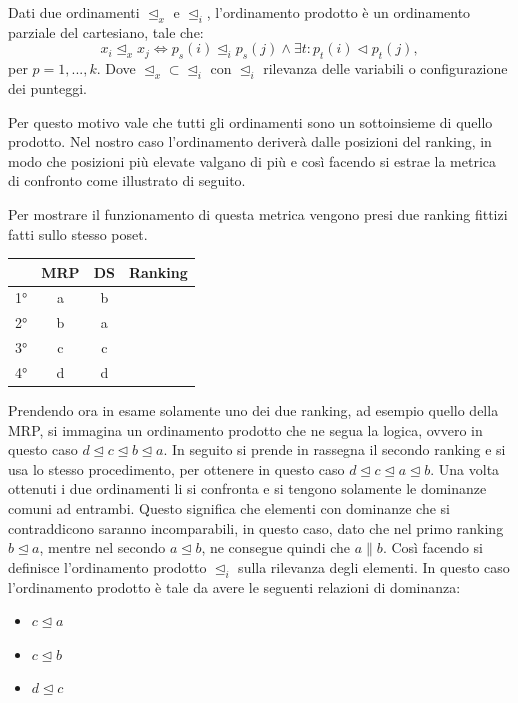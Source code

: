 \documentclass{report}
\begin{document}
\begin{definition}
Dati due ordinamenti $\unlhd_x$ e $\unlhd_i$, l'ordinamento prodotto è un ordinamento parziale del cartesiano, tale che: 
\[x_i\unlhd_x x_j \Leftrightarrow p_{s}(i)\unlhd_i p_{s}(j) \land \exists t:p_t(i) \lhd p_t(j),\]
per $p=1, ...,k$. Dove $\unlhd_x \subset \unlhd_i$ con $\unlhd_i$ rilevanza delle variabili o configurazione dei punteggi.
\end{definition}

Per questo motivo vale che tutti gli ordinamenti sono un sottoinsieme di quello prodotto.
Nel nostro caso l'ordinamento deriverà dalle posizioni del ranking, in modo che posizioni più elevate valgano di più e così facendo si estrae la metrica di confronto come illustrato di seguito.

Per mostrare il funzionamento di questa metrica vengono presi due ranking fittizi fatti sullo stesso poset.
\begin{table}[H]
\centering
	\begin{tabular}{l c c}
	& MRP & DS & Ranking \\
	\hline
    \ang{1} &	a &	b \\		
    \ang{2} &	b &	a \\		
    \ang{3} &	c &	c \\		
    \ang{4} &	d &	d \\		
    \hline
    \end{tabular}
\end{table}

Prendendo ora in esame solamente uno dei due ranking, ad esempio quello della MRP, si immagina un ordinamento prodotto che ne segua la logica, ovvero in questo caso $d\unlhd c \unlhd b \unlhd a$. In seguito si prende in rassegna il secondo ranking e si usa lo stesso procedimento, per ottenere in questo caso $d\unlhd c \unlhd a \unlhd b$. Una volta ottenuti i due ordinamenti li si confronta e si tengono solamente le dominanze comuni ad entrambi. Questo significa che elementi con dominanze che si contraddicono saranno incomparabili, in questo caso, dato che nel primo ranking $b \unlhd a$, mentre nel secondo $a \unlhd b$, ne consegue quindi che $a\parallel b$. Così facendo si definisce l'ordinamento prodotto $\unlhd_i$ sulla rilevanza degli elementi. In questo caso l'ordinamento prodotto è tale da avere le seguenti relazioni di dominanza: 
\begin{itemize}
    \item[] $c \unlhd a$
    \item[] $c \unlhd b$
    \item[] $d \unlhd c$
\end{itemize}
\end{document}
